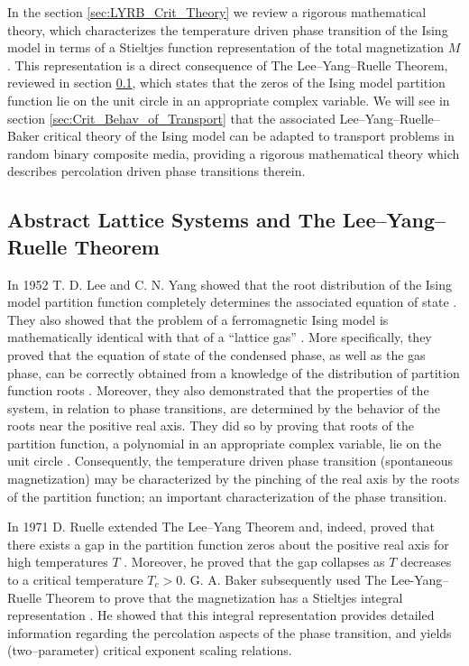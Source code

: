 \documentclass[english,12pt]{ttuthes}
\begin{document}
In the section \ref{sec:LYRB_Crit_Theory} we review a rigorous
mathematical theory, which characterizes the temperature driven phase 
transition of the Ising model in terms of a Stieltjes function
representation of the total magnetization $M$. This representation is
a direct consequence of The Lee--Yang--Ruelle Theorem, reviewed in
section \ref{sec:RuelleIsing}, which states that the zeros of the
Ising model partition function lie on the unit circle in an
appropriate complex variable. We will see in section
\ref{sec:Crit_Behav_of_Transport} that the associated
Lee--Yang--Ruelle--Baker critical theory of the Ising model can be 
adapted to transport problems in random binary composite media,
providing a rigorous mathematical theory which describes percolation
driven phase transitions therein.   

\subsection{Abstract Lattice Systems and The Lee--Yang--Ruelle Theorem}
\label{sec:RuelleIsing}
%
In 1952 T. D. Lee and C. N. Yang showed that the root distribution of
the Ising model partition function completely determines the
associated equation of state \cite{Yang:PR:404}. They also showed that
the problem of a ferromagnetic Ising model is mathematically identical
with that of a ``lattice gas'' \cite{Lee:PR:411,Thompson-1988}. More
specifically, they proved that the equation of state of the condensed
phase, as well as the gas phase, can be correctly obtained from a
knowledge of the distribution of partition function roots
\cite{Yang:PR:404,Lee:PR:411}. Moreover, they also demonstrated that
the properties of the system, in relation to phase transitions, are
determined by the behavior of the roots near the positive real
axis. They did so by proving that roots of the partition function, a
polynomial in an appropriate complex variable, lie on the unit circle
\cite{Lee:PR:411,Ruelle-1969}. Consequently, the temperature driven
phase transition (spontaneous magnetization) may be characterized by
the pinching of the real axis by the roots of the partition function;
an important characterization of the phase transition.

In 1971 D. Ruelle extended The Lee--Yang Theorem and, indeed, proved
that there exists a gap in the partition function zeros about the
positive real axis for high temperatures $T$
\cite{Ruelle:PRL:303}. Moreover, he proved that the gap collapses as
$T$ decreases to a critical temperature $T_c>0$. G. A. Baker subsequently
used The Lee-Yang--Ruelle Theorem to prove that the magnetization has
a Stieltjes integral representation
\cite{Baker:PRB:1184,Baker:PR:434,Baker:PRL-990,Gaunt:PRB-1184,Baker-1990}. He
showed that this integral representation provides detailed information
regarding the percolation aspects of the phase transition, and yields
(two--parameter) critical exponent scaling relations.  
\end{document}
